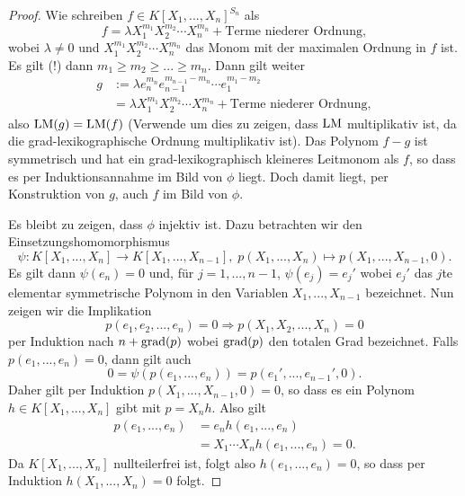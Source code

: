 \documentclass{book}
\begin{document}
\begin{proof}
    Wie schreiben $f \in K[X_1,...,X_n]^{S_n}$ als
    \[
        f = \lambda X_1^{m_1}X_2^{m_2} \cdots X_n^{m_n} + \text{Terme niederer Ordnung},
    \]
    wobei $\lambda \ne 0$ und $X_1^{m_1}X_2^{m_2} \cdots X_n^{m_n}$ das Monom
    mit der maximalen Ordnung in $f$ ist. Es gilt (!) dann $m_1 \ge m_2 \ge ...
    \ge m_n$. Dann gilt weiter
    \begin{align*}
        g & := \lambda e_n^{m_n} e_{n-1}^{m_{n-1} - m_n} \cdots e_1^{m_1 - m_2}\\
          & = \lambda X_1^{m_1}X_2^{m_2} \cdots X_n^{m_n} + \text{Terme niederer Ordnung},
    \end{align*}
    also $\operatorname{LM}(g) = \operatorname{LM}(f)$ (Verwende um dies zu zeigen, dass $\operatorname{LM}$ multiplikativ ist, da die
    grad-lexikographische Ordnung multiplikativ ist). Das Polynom $f - g$ ist
    symmetrisch und hat ein grad-lexikographisch kleineres Leitmonom als $f$,
    so dass es per Induktionsannahme im Bild von $\phi$ liegt. Doch damit
    liegt, per Konstruktion von $g$, auch $f$ im Bild von $\phi$.

    Es bleibt zu zeigen, dass $\phi$ injektiv ist. Dazu betrachten wir den Einsetzungshomomorphismus
    \[
        \psi: K[X_1, ..., X_n] \to K[X_1, ..., X_{n-1}], \; p(X_1, ..., X_n) \mapsto p(X_1, ..., X_{n-1}, 0).
    \]
    Es gilt dann $\psi(e_n) = 0$ und, für $j = 1, ..., n-1$, $\psi(e_j) = e_j'$
    wobei $e_j'$ das $j$te elementar symmetrische Polynom in den Variablen
    $X_1, ..., X_{n-1}$ bezeichnet. Nun zeigen wir die Implikation
    \[
        p(e_1, e_2, ..., e_n) = 0 \Rightarrow p(X_1, X_2, ..., X_n) = 0 
    \]
    per Induktion nach $n + \operatorname{grad}(p)$ wobei $\operatorname{grad}(p)$ den totalen Grad
    bezeichnet. Falls $p(e_1, ..., e_n) = 0$, dann gilt auch
    \[
        0 = \psi(p(e_1, ..., e_n)) = p(e_1', ..., e_{n-1}',0).
    \]
    Daher gilt per Induktion $p(X_1, ..., X_{n-1},0) = 0$, so dass es ein
    Polynom $h \in K[X_1,...,X_n]$ gibt mit $p = X_n h$. 
    Also gilt
    \begin{align*}
        p(e_1, ..., e_n) & = e_n h(e_1, ..., e_n)\\
                         & = X_1 \cdots X_n h(e_1, ..., e_n) = 0.
    \end{align*}
    Da $K[X_1, ..., X_n]$ nullteilerfrei ist, folgt also $h(e_1, ..., e_n) =
    0$, so dass per Induktion $h(X_1, ..., X_n) = 0$ folgt. 
\end{proof}
\end{document}
